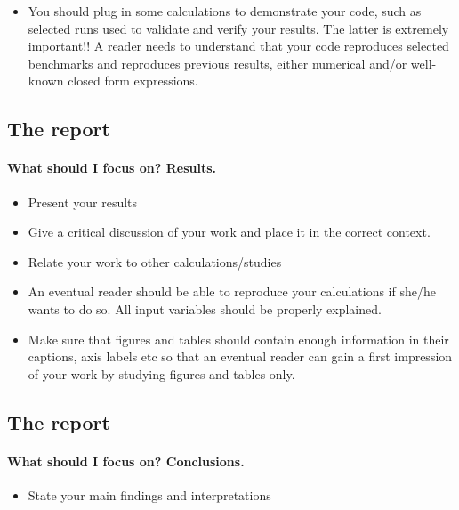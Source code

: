 \documentclass[%
oneside,                 %
final,                   %
10pt]{article}
\begin{document}
{{{{{{{{{{{{{{{\begin{itemize}
 \item You should plug in some calculations to demonstrate your code, such as selected runs used to validate and verify your results. The latter is extremely important!!  A reader needs to understand that your code reproduces selected benchmarks and reproduces previous results, either numerical and/or well-known  closed form expressions.
\end{itemize}

\noindent




\subsection{The report}

\paragraph{What should I focus on? Results.}
\begin{itemize}
 \item Present your results

 \item Give a critical discussion of your work and place it in the correct context.

 \item Relate your work to other calculations/studies

 \item An eventual reader should be able to reproduce your calculations if she/he wants to do so. All input variables should be properly explained.

 \item Make sure that figures and tables should contain enough information in their captions, axis labels etc so that an eventual reader can gain a first impression of your work by studying figures and tables only.
\end{itemize}

\noindent




\subsection{The report}

\paragraph{What should I focus on? Conclusions.}
\begin{itemize}
 \item State your main findings and interpretations


\end{itemize}}}}}}}}}}}}}}}}
\end{document}
